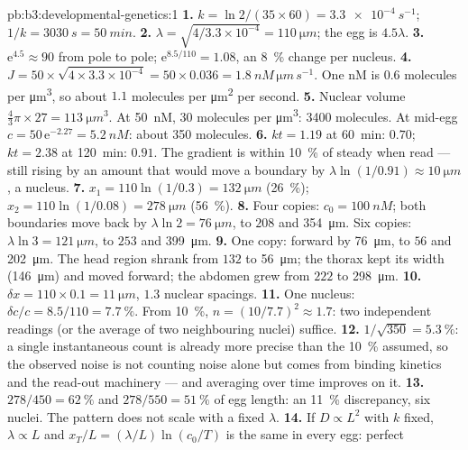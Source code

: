 \begin{solution}{pb:b3:developmental-genetics:1}
\textbf{1.} $k = \ln 2/(35\times 60) = \qty{3.3e-4}{s^{-1}}$; $1/k =
\qty{3030}{s} = \qty{50}{min}$.
\textbf{2.} $\lambda = \sqrt{4/3.3\times 10^{-4}} = \qty{110}{\micro m}$;
the egg is $4.5\lambda$.
\textbf{3.} $\mathrm{e}^{4.5} \approx 90$ from pole to pole;
$\mathrm{e}^{8.5/110} = 1.08$, an \qty{8}{\%} change per nucleus.
\textbf{4.} $J = 50\times\sqrt{4\times 3.3\times 10^{-4}} = 50\times
0.036 = \qty{1.8}{nM\,\micro m\,s^{-1}}$. One nM is $0.6$ molecules
per \unit{\micro m^3}, so about $1.1$ molecules per \unit{\micro m^2}
per second.
\textbf{5.} Nuclear volume $\tfrac{4}{3}\pi\times 27 = \qty{113}{\micro
m^3}$. At \qty{50}{nM}, $30$ molecules per \unit{\micro m^3}:
\num{3400} molecules. At mid-egg $c = 50\,\mathrm{e}^{-2.27} =
\qty{5.2}{nM}$: about \num{350} molecules.
\textbf{6.} $kt = 1.19$ at \qty{60}{min}: $0.70$; $kt = 2.38$ at
\qty{120}{min}: $0.91$. The gradient is within \qty{10}{\%} of steady
when read --- still rising by an amount that would move a boundary by
$\lambda\ln(1/0.91) \approx \qty{10}{\micro m}$, a nucleus.
\textbf{7.} $x_{1} = 110\ln(1/0.3) = \qty{132}{\micro m}$
(\qty{26}{\%}); $x_{2} = 110\ln(1/0.08) = \qty{278}{\micro m}$
(\qty{56}{\%}).
\textbf{8.} Four copies: $c_{0} = \qty{100}{nM}$; both boundaries move
back by $\lambda\ln 2 = \qty{76}{\micro m}$, to $208$ and
\qty{354}{\micro m}. Six copies: $\lambda\ln 3 = \qty{121}{\micro m}$,
to $253$ and \qty{399}{\micro m}.
\textbf{9.} One copy: forward by \qty{76}{\micro m}, to $56$ and
\qty{202}{\micro m}. The head region shrank from $132$ to
\qty{56}{\micro m}; the thorax kept its width (\qty{146}{\micro m}) and
moved forward; the abdomen grew from $222$ to \qty{298}{\micro m}.
\textbf{10.} $\delta x = 110\times 0.1 = \qty{11}{\micro m}$, $1.3$
nuclear spacings.
\textbf{11.} One nucleus: $\delta c/c = 8.5/110 = \qty{7.7}{\%}$. From
\qty{10}{\%}, $n = (10/7.7)^{2} \approx 1.7$: two independent readings
(or the average of two neighbouring nuclei) suffice.
\textbf{12.} $1/\sqrt{350} = \qty{5.3}{\%}$: a single instantaneous
count is already more precise than the \qty{10}{\%} assumed, so the
observed noise is not counting noise alone but comes from binding
kinetics and the read-out machinery --- and averaging over time
improves on it.
\textbf{13.} $278/450 = \qty{62}{\%}$ and $278/550 = \qty{51}{\%}$ of
egg length: an \qty{11}{\%} discrepancy, six nuclei. The pattern does
not scale with a fixed $\lambda$.
\textbf{14.} If $D \propto L^{2}$ with $k$ fixed, $\lambda \propto L$ and
$x_{T}/L = (\lambda/L)\ln(c_{0}/T)$ is the same in every egg: perfect

\end{solution}
